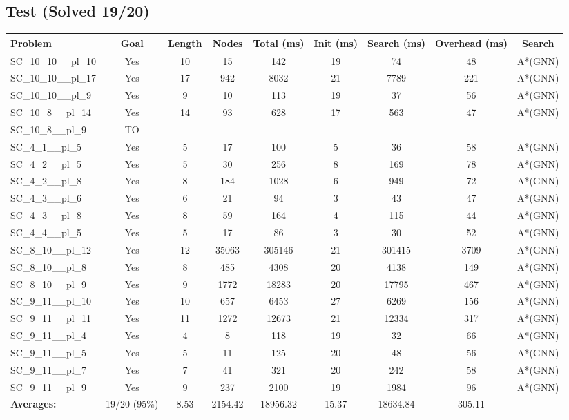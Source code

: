 \documentclass{article}
\begin{document}
\subsection*{Test (Solved 19/20)}
\begin{tabular}{lcccccccc}
\toprule
Problem & Goal & Length & Nodes & Total (ms) & Init (ms) & Search (ms) & Overhead (ms) & Search \\
\midrule
SC\_10\_10\_\_pl\_10 & Yes & 10 & 15 & 142 & 19 & 74 & 48 & A*(GNN) \\
SC\_10\_10\_\_pl\_17 & Yes & 17 & 942 & 8032 & 21 & 7789 & 221 & A*(GNN) \\
SC\_10\_10\_\_pl\_9 & Yes & 9 & 10 & 113 & 19 & 37 & 56 & A*(GNN) \\
SC\_10\_8\_\_pl\_14 & Yes & 14 & 93 & 628 & 17 & 563 & 47 & A*(GNN) \\
SC\_10\_8\_\_pl\_9 & TO & - & - & - & - & - & - & - \\
SC\_4\_1\_\_pl\_5 & Yes & 5 & 17 & 100 & 5 & 36 & 58 & A*(GNN) \\
SC\_4\_2\_\_pl\_5 & Yes & 5 & 30 & 256 & 8 & 169 & 78 & A*(GNN) \\
SC\_4\_2\_\_pl\_8 & Yes & 8 & 184 & 1028 & 6 & 949 & 72 & A*(GNN) \\
SC\_4\_3\_\_pl\_6 & Yes & 6 & 21 & 94 & 3 & 43 & 47 & A*(GNN) \\
SC\_4\_3\_\_pl\_8 & Yes & 8 & 59 & 164 & 4 & 115 & 44 & A*(GNN) \\
SC\_4\_4\_\_pl\_5 & Yes & 5 & 17 & 86 & 3 & 30 & 52 & A*(GNN) \\
SC\_8\_10\_\_pl\_12 & Yes & 12 & 35063 & 305146 & 21 & 301415 & 3709 & A*(GNN) \\
SC\_8\_10\_\_pl\_8 & Yes & 8 & 485 & 4308 & 20 & 4138 & 149 & A*(GNN) \\
SC\_8\_10\_\_pl\_9 & Yes & 9 & 1772 & 18283 & 20 & 17795 & 467 & A*(GNN) \\
SC\_9\_11\_\_pl\_10 & Yes & 10 & 657 & 6453 & 27 & 6269 & 156 & A*(GNN) \\
SC\_9\_11\_\_pl\_11 & Yes & 11 & 1272 & 12673 & 21 & 12334 & 317 & A*(GNN) \\
SC\_9\_11\_\_pl\_4 & Yes & 4 & 8 & 118 & 19 & 32 & 66 & A*(GNN) \\
SC\_9\_11\_\_pl\_5 & Yes & 5 & 11 & 125 & 20 & 48 & 56 & A*(GNN) \\
SC\_9\_11\_\_pl\_7 & Yes & 7 & 41 & 321 & 20 & 242 & 58 & A*(GNN) \\
SC\_9\_11\_\_pl\_9 & Yes & 9 & 237 & 2100 & 19 & 1984 & 96 & A*(GNN) \\
\textbf{Averages:} & 19/20 (95\%) & 8.53 & 2154.42 & 18956.32 & 15.37 & 18634.84 & 305.11 & \\
\bottomrule
\end{tabular}
\\[0.7cm]
\end{document}
